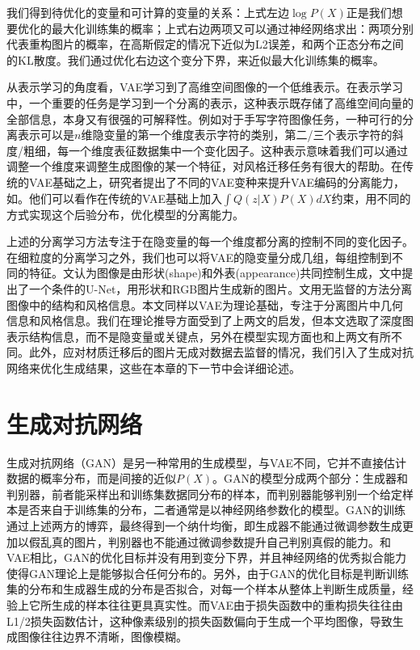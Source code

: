 \documentclass[UTF8,openany,AutoFakeBold,AutoFakeSlant,cs4size]{ctexbook}
\begin{document}
我们得到待优化的变量和可计算的变量的关系：上式左边$\log P(X)$正是我们想要优化的最大化训练集的概率；上式右边两项又可以通过神经网络求出：两项分别代表重构图片的概率，在高斯假定的情况下近似为L2误差，和两个正态分布之间的KL散度。我们通过优化右边这个变分下界，来近似最大化训练集的概率。

从表示学习的角度看，VAE学习到了高维空间图像的一个低维表示。在表示学习中，一个重要的任务是学习到一个分离的表示，这种表示既存储了高维空间向量的全部信息，本身又有很强的可解释性。例如对于手写字符图像任务，一种可行的分离表示可以是$n$维隐变量的第一个维度表示字符的类别，第二/三个表示字符的斜度/粗细，每一个维度表征数据集中一个变化因子。这种表示意味着我们可以通过调整一个维度来调整生成图像的某一个特征，对风格迁移任务有很大的帮助。在传统的VAE基础之上，研究者提出了不同的VAE变种来提升VAE编码的分离能力，如\cite{Burgess2018UnderstandingDI, RubSchTol18b}。他们可以看作在传统的VAE基础上加入$\int Q(z|X) P(X) dX$约束，用不同的方式实现这个后验分布，优化模型的分离能力。

上述的分离学习方法专注于在隐变量的每一个维度都分离的控制不同的变化因子。在细粒度的分离学习之外，我们也可以将VAE的隐变量分成几组，每组控制到不同的特征。\cite{vunet2018}文认为图像是由形状(shape)和外表(appearance)共同控制生成，文中提出了一个条件的U-Net，用形状和RGB图片生成新的图片。\cite{Wu2019DisentanglingCA}文用无监督的方法分离图像中的结构和风格信息。本文同样以VAE为理论基础，专注于分离图片中几何信息和风格信息。我们在理论推导方面受到了上两文的启发，但本文选取了深度图表示结构信息，而不是隐变量\cite{vunet2018}或关键点\cite{Wu2019DisentanglingCA}，另外在模型实现方面也和上两文有所不同。此外，应对材质迁移后的图片无成对数据去监督的情况，我们引入了生成对抗网络来优化生成结果，这些在本章的下一节中会详细论述。

\section{生成对抗网络}

生成对抗网络（GAN）\cite{NIPS2014_5423}是另一种常用的生成模型，与VAE不同，它并不直接估计数据的概率分布，而是间接的近似$P(X)$。GAN的模型分成两个部分：生成器和判别器，前者能采样出和训练集数据同分布的样本，而判别器能够判别一个给定样本是否来自于训练集的分布，二者通常是以神经网络参数化的模型。GAN的训练通过上述两方的博弈，最终得到一个纳什均衡，即生成器不能通过微调参数生成更加以假乱真的图片，判别器也不能通过微调参数提升自己判别真假的能力。和VAE相比，GAN的优化目标并没有用到变分下界，并且神经网络的优秀拟合能力使得GAN理论上是能够拟合任何分布的。另外，由于GAN的优化目标是判断训练集的分布和生成器生成的分布是否拟合，对每一个样本从整体上判断生成质量，经验上它所生成的样本往往更具真实性。而VAE由于损失函数中的重构损失往往由L1/2损失函数估计，这种像素级别的损失函数偏向于生成一个平均图像，导致生成图像往往边界不清晰，图像模糊。
\end{document}
